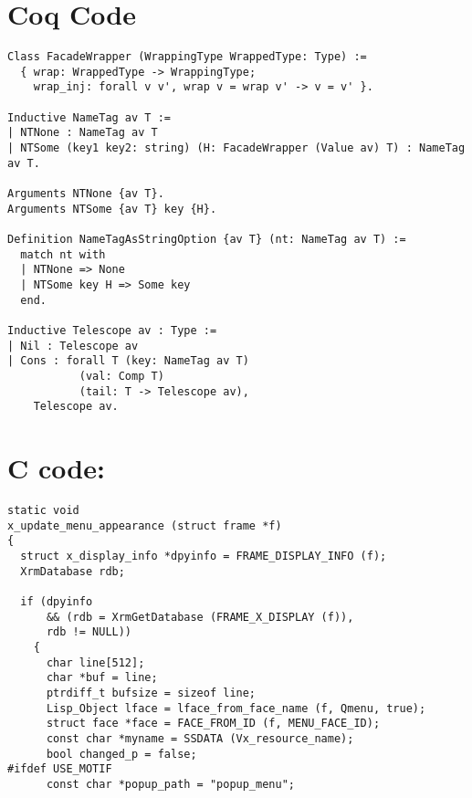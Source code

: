 \documentclass{article}
\begin{document}
\section*{Coq Code}
\begin{Verbatim}
Class FacadeWrapper (WrappingType WrappedType: Type) :=
  { wrap: WrappedType -> WrappingType;
    wrap_inj: forall v v', wrap v = wrap v' -> v = v' }.

Inductive NameTag av T :=
| NTNone : NameTag av T
| NTSome (key1 key2: string) (H: FacadeWrapper (Value av) T) : NameTag av T.

Arguments NTNone {av T}.
Arguments NTSome {av T} key {H}.

Definition NameTagAsStringOption {av T} (nt: NameTag av T) :=
  match nt with
  | NTNone => None
  | NTSome key H => Some key
  end.

Inductive Telescope av : Type :=
| Nil : Telescope av
| Cons : forall T (key: NameTag av T)
           (val: Comp T)
           (tail: T -> Telescope av),
    Telescope av.
\end{Verbatim}

\section*{C code:}
\begin{Verbatim}
static void
x_update_menu_appearance (struct frame *f)
{
  struct x_display_info *dpyinfo = FRAME_DISPLAY_INFO (f);
  XrmDatabase rdb;

  if (dpyinfo
      && (rdb = XrmGetDatabase (FRAME_X_DISPLAY (f)),
      rdb != NULL))
    {
      char line[512];
      char *buf = line;
      ptrdiff_t bufsize = sizeof line;
      Lisp_Object lface = lface_from_face_name (f, Qmenu, true);
      struct face *face = FACE_FROM_ID (f, MENU_FACE_ID);
      const char *myname = SSDATA (Vx_resource_name);
      bool changed_p = false;
#ifdef USE_MOTIF
      const char *popup_path = "popup_menu";
\end{Verbatim}
\end{document}
